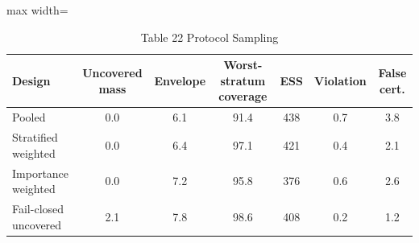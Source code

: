 \begin{table}[tbp]
\centering
\scriptsize
\caption{Table 22 Protocol Sampling}
\label{tab:table_22_protocol_sampling}
\begin{adjustbox}{max width=\linewidth}
\begin{tabular}{lcccccc}
\toprule
Design & Uncovered mass & Envelope & Worst-stratum coverage & ESS & Violation & False cert. \\
\midrule
Pooled & 0.0 & 6.1 & 91.4 & 438 & 0.7 & 3.8 \\
Stratified weighted & 0.0 & 6.4 & 97.1 & 421 & 0.4 & 2.1 \\
Importance weighted & 0.0 & 7.2 & 95.8 & 376 & 0.6 & 2.6 \\
Fail-closed uncovered & 2.1 & 7.8 & 98.6 & 408 & 0.2 & 1.2 \\
\bottomrule
\end{tabular}
\end{adjustbox}
\end{table}
